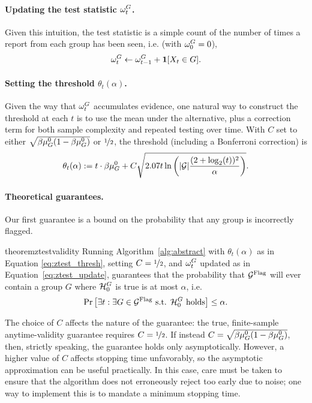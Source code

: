 \paragraph{Updating the test statistic $\omega_t^G$.}
Given this intuition, the test statistic is a simple count of the number of times a report from each group has been seen, i.e. (with $\omega_0^G = 0$),
\begin{equation}
    \label{eq:ztest_update}
    \omega_t^G \leftarrow \omega_{t-1}^G +\mathbf{1}[X_t\in G]. 
\end{equation}
\paragraph{Setting the threshold $\theta_t(\alpha)$.}
Given the way that $\omega_t^G$ accumulates evidence, one natural way to construct the threshold at each $t$ is to use the mean under the alternative, plus a correction term for both sample complexity and repeated testing over time. With $C$ set to either $\sqrt{\beta{\mu_G^0}(1 - \beta{\mu_G^0})}$ or $\nicefrac12$, the threshold (including a Bonferroni correction) is 
\begin{equation}
    \label{eq:ztest_thresh}
    \theta_t(\alpha) := t \cdot \beta{\mu_G^0} + C \sqrt{
    2.07 t
    \ln\left(|{\mathcal{G}}| \frac{(2 + \log_2(t))^2}{\alpha}\right)
    }.
\end{equation}

\paragraph{Theoretical guarantees.}
Our first guarantee is a bound on the probability that any group is incorrectly flagged. 
\begin{restatable}[Validity]{theorem}{ztestvalidity}
\label{thm:validity_ztest}
Running Algorithm~\ref{alg:abstract} with $\theta_t(\alpha)$ as in Equation \eqref{eq:ztest_thresh}, setting $C = \nicefrac
12$, and $\omega_t^G$ updated as in Equation~\eqref{eq:ztest_update}, guarantees that 
the probability that ${\mathcal {G}^{\text{Flag}}}$ will ever contain a group $G$ where ${\mathcal{H}_0^G}$ is true is at most $\alpha$, i.e. 
\[
\Pr\left[\exists t: \exists G \in {\mathcal {G}^{\text{Flag}}} \text{ s.t. } {\mathcal{H}_0^G} \text{ holds}\right] \leq \alpha.
\]
\end{restatable}

The choice of $C$ affects the nature of the guarantee: the true, finite-sample anytime-validity guarantee requires $C = \nicefrac12$. If instead $C = \sqrt{\beta{\mu_G^0}(1 - \beta{\mu_G^0})}$, then, strictly speaking, the guarantee holds only asymptotically. However, a higher value of $C$ affects stopping time unfavorably, so the asymptotic approximation can be useful practically. In this case, care must be taken to ensure that the algorithm does not erroneously reject too early due to noise; one way to implement this is to mandate a minimum stopping time. 

